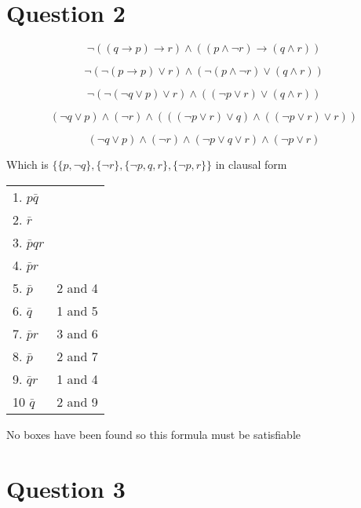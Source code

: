 \documentclass[10pt,a4paper]{article}
\begin{document}
\section{Question 2}

\begin{equation}
 \neg ((q\rightarrow p)\rightarrow r)\wedge ((p \wedge \neg r)\rightarrow (q\wedge r))
\end{equation}

\begin{equation}
 \neg(\neg(p\rightarrow p) \vee r) \wedge (\neg(p\wedge \neg r) \vee (q\wedge r))
\end{equation}

\begin{equation}
\neg(\neg(\neg q \vee p)\vee r)\wedge ((\neg p \vee r)\vee (q\wedge r))
\end{equation}

\begin{equation}
 (\neg q\vee p) \wedge (\neg r) \wedge (((\neg p \vee r)\vee q)\wedge((\neg p \vee r)\vee r))
\end{equation}

\begin{equation}
 (\neg q\vee p) \wedge (\neg r) \wedge (\neg p\vee q\vee r) \wedge(\neg p\vee r)
\end{equation}

Which is $\{\{p,\neg q\},\{\neg r\},\{\neg p,q,r \},\{\neg p,r\}\}$ in clausal form


\begin{tabular}{ll}
1. $p\bar{q}$  &\\
2. $\bar{r}$   &\\
3. $\bar{p}qr$ &\\
4. $\bar{p}r$  &\\
5. $\bar{p}$   &           2 and 4\\
6. $\bar{q}$   &           1 and 5\\
7. $\bar{p}r$  &           3 and 6\\
8. $\bar{p}$   &           2 and 7\\
9. $\bar{q}r$  &           1 and 4\\
10 $\bar{q}$   &           2 and 9\\
\end{tabular}

No boxes have been found so this formula must be satisfiable

\section{Question 3}
\end{document}
